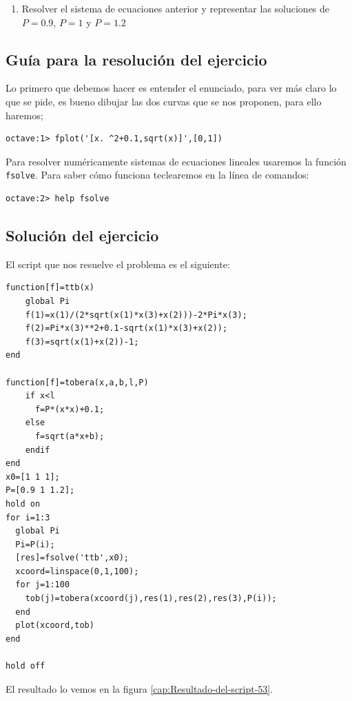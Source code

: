 \begin{enumerate}
\item Resolver el sistema de ecuaciones anterior y representar las
  soluciones de $P=0.9$, $P=1$ y $P=1.2$
\end{enumerate}

\subsection{Guía para la resolución del ejercicio}

Lo primero que debemos hacer es entender el enunciado, para ver más
claro lo que se pide, es bueno dibujar las dos curvas que se nos proponen,
para ello haremos;

\begin{verbatim}
octave:1> fplot('[x. ^2+0.1,sqrt(x)]',[0,1])
\end{verbatim}
Para resolver numéricamente sistemas de ecuaciones lineales usaremos
la función \texttt{fsolve}. Para saber cómo funciona teclearemos en
la línea de comandos: 

\begin{verbatim}
octave:2> help fsolve
\end{verbatim}

\subsection{Solución del ejercicio}

El script que nos resuelve el problema es el siguiente: 

\begin{verbatim}
function[f]=ttb(x)
    global Pi
    f(1)=x(1)/(2*sqrt(x(1)*x(3)+x(2)))-2*Pi*x(3);
    f(2)=Pi*x(3)**2+0.1-sqrt(x(1)*x(3)+x(2));
    f(3)=sqrt(x(1)+x(2))-1;
end   
  
function[f]=tobera(x,a,b,l,P)
    if x<l
      f=P*(x*x)+0.1;
    else
      f=sqrt(a*x+b);
    endif
end   
x0=[1 1 1];
P=[0.9 1 1.2];
hold on   
for i=1:3
  global Pi
  Pi=P(i);
  [res]=fsolve('ttb',x0);
  xcoord=linspace(0,1,100);   
  for j=1:100
    tob(j)=tobera(xcoord(j),res(1),res(2),res(3),P(i));
  end
  plot(xcoord,tob)
end   
   
hold off
\end{verbatim}

El resultado lo vemos en la figura \ref{cap:Resultado-del-script-53}.

